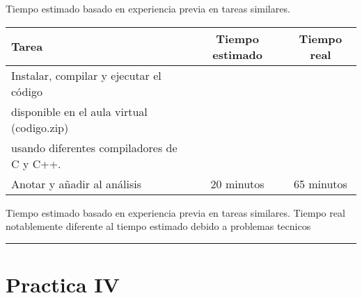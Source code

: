 \documentclass[12pt,a4paper]{article}
\newcommand{\separadorseccion}{%
    \vspace{1em}
    \hrule
    \vspace{1em}
}
\begin{document}
    \begin{center}
        Tiempo estimado basado en experiencia previa en tareas similares.
    \end{center}
    \begin{center}
        \begin{tabular}{|l|c|c|}
            \hline
            \textbf{Tarea} & \textbf{Tiempo estimado} & \textbf{Tiempo real} \\
            \hline
            Instalar, compilar y ejecutar el código 
\\disponible en el aula virtual (codigo.zip) 
\\usando diferentes compiladores de C y C++. 
\\Anotar y añadir al análisis & 20 minutos & 65 minutos \\
            \hline
        \end{tabular}
    \end{center}
    \begin{center}
        Tiempo estimado basado en experiencia previa en tareas similares.
        \newline
        Tiempo real notablemente diferente al tiempo estimado debido a problemas tecnicos
    \end{center}


\separadorseccion


\section{Practica IV}
\end{document}
